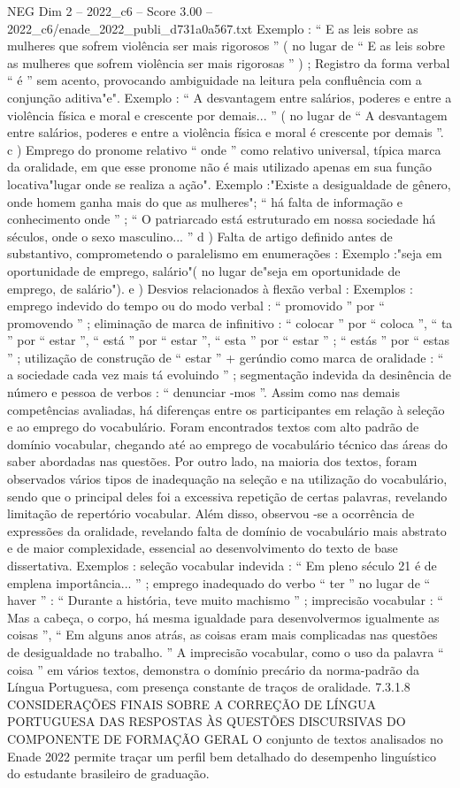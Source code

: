 \begin{textsample}{NEG Dim 2 – 2022\_c6 – Score 3.00 – 2022\_c6/enade\_2022\_publi\_d731a0a567.txt}
Exemplo : “ E as leis sobre as mulheres que sofrem violência ser mais rigorosos ” ( no lugar de “ E as leis sobre as mulheres que sofrem violência ser mais rigorosas ” ) ; Registro da forma verbal “ é ” sem acento, provocando ambiguidade na leitura pela confluência com a conjunção aditiva"e".
Exemplo : “ A desvantagem entre salários, poderes e entre a violência física e moral e crescente por demais... ” ( no lugar de “ A desvantagem entre salários, poderes e entre a violência física e moral é crescente por demais ”. c ) Emprego do pronome relativo “ onde ” como relativo universal, típica marca da oralidade, em que esse pronome não é mais utilizado apenas em sua função locativa"lugar onde se realiza a ação".
Exemplo :"Existe a desigualdade de gênero, onde homem ganha mais do que as mulheres"; “ há falta de informação e conhecimento onde ” ; “ O patriarcado está estruturado em nossa sociedade há séculos, onde o sexo masculino... ” d ) Falta de artigo definido antes de substantivo, comprometendo o paralelismo em enumerações : Exemplo :"seja em oportunidade de emprego, salário"( no lugar de"seja em oportunidade de emprego, de salário"). e ) Desvios relacionados à flexão verbal : Exemplos : emprego indevido do tempo ou do modo verbal : “ promovido ” por “ promovendo ” ; eliminação de marca de infinitivo : “ colocar ” por “ coloca ”, “ ta ” por “ estar ”, “ está ” por “ estar ”, “ esta ” por “ estar ” ; “ estás ” por “ estas ” ; utilização de construção de “ estar ” + gerúndio como marca de oralidade : “ a sociedade cada vez mais tá evoluindo ” ; segmentação indevida da desinência de número e pessoa de verbos : “ denunciar -mos ”.
Assim como nas demais competências avaliadas, há diferenças entre os participantes em relação à seleção e ao emprego do vocabulário.
Foram encontrados textos com alto padrão de domínio vocabular, chegando até ao emprego de vocabulário técnico das áreas do saber abordadas nas questões.
Por outro lado, na maioria dos textos, foram observados vários tipos de inadequação na seleção e na utilização do vocabulário, sendo que o principal deles foi a excessiva repetição de certas palavras, revelando limitação de repertório vocabular.
Além disso, observou -se a ocorrência de expressões da oralidade, revelando falta de domínio de vocabulário mais abstrato e de maior complexidade, essencial ao desenvolvimento do texto de base dissertativa.
Exemplos : seleção vocabular indevida : “ Em pleno século 21 é de emplena importância... ” ; emprego inadequado do verbo “ ter ” no lugar de “ haver ” : “ Durante a história, teve muito machismo ” ; imprecisão vocabular : “ Mas a cabeça, o corpo, há mesma igualdade para desenvolvermos igualmente as coisas ”, “ Em alguns anos atrás, as coisas eram mais complicadas nas questões de desigualdade no trabalho. ” A imprecisão vocabular, como o uso da palavra “ coisa ” em vários textos, demonstra o domínio precário da norma-padrão da Língua Portuguesa, com presença constante de traços de oralidade. 7.3.1.8 CONSIDERAÇÕES FINAIS SOBRE A CORREÇÃO DE LÍNGUA PORTUGUESA DAS RESPOSTAS ÀS QUESTÕES DISCURSIVAS DO COMPONENTE DE FORMAÇÃO GERAL O conjunto de textos analisados no Enade 2022 permite traçar um perfil bem detalhado do desempenho linguístico do estudante brasileiro de graduação.

\end{textsample}
